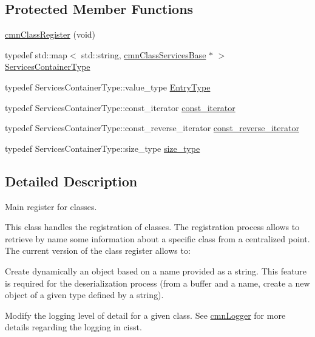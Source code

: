 \subsection*{Protected Member Functions}
\begin{DoxyCompactItemize}
\item 
\hyperlink{classcmn_class_register_a7dfc2396cd035f150c84d7f2aa1286b8}{cmn\+Class\+Register} (void)
\end{DoxyCompactItemize}
\begin{DoxyCompactItemize}
\item 
typedef std\+::map$<$ std\+::string, \hyperlink{classcmn_class_services_base}{cmn\+Class\+Services\+Base} $\ast$ $>$ \hyperlink{classcmn_class_register_afad21d7d550eea4f0e0ce5209e7fc437}{Services\+Container\+Type}
\item 
typedef Services\+Container\+Type\+::value\+\_\+type \hyperlink{classcmn_class_register_ac19a6e242b59d7f0336be30be97fabaf}{Entry\+Type}
\item 
typedef Services\+Container\+Type\+::const\+\_\+iterator \hyperlink{classcmn_class_register_aacfef62640c83b00064eba6c1f667e26}{const\+\_\+iterator}
\item 
typedef Services\+Container\+Type\+::const\+\_\+reverse\+\_\+iterator \hyperlink{classcmn_class_register_afdce6482c138fc3c4cb611f0ef7c7a08}{const\+\_\+reverse\+\_\+iterator}
\item 
typedef Services\+Container\+Type\+::size\+\_\+type \hyperlink{classcmn_class_register_ac90771194c85a9fff753d9d623071b01}{size\+\_\+type}
\end{DoxyCompactItemize}


\subsection{Detailed Description}
Main register for classes. 

This class handles the registration of classes. The registration process allows to retrieve by name some information about a specific class from a centralized point. The current version of the class register allows to\+:


\begin{DoxyItemize}
\item Create dynamically an object based on a name provided as a string. This feature is required for the deserialization process (from a buffer and a name, create a new object of a given type defined by a string).
\item Modify the logging level of detail for a given class. See \hyperlink{classcmn_logger}{cmn\+Logger} for more details regarding the logging in cisst.
\end{DoxyItemize}

